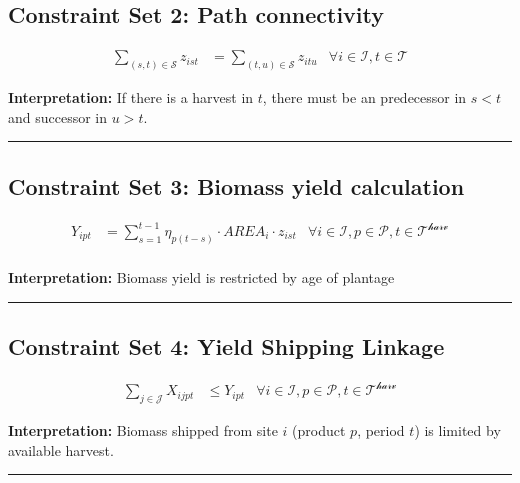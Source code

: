 \documentclass[
  11pt,
  11pt,
  a4paper]{article}
\begin{document}
\subsection{Constraint Set 2: Path
connectivity}\label{constraint-set-2-path-connectivity}

\begin{align}
\sum_{ (s,t) \in \mathcal{S}} z_{ist} &= \sum_{(t,u) \in \mathcal{S}} z_{itu} & \forall i \in \mathcal{I}, t \in \mathcal{T} \tag{C2}
\end{align}

\textbf{Interpretation:} If there is a harvest in \(t\), there must be
an predecessor in \(s<t\) and successor in \(u>t\).

\begin{center}\rule{0.5\linewidth}{0.5pt}\end{center}

\subsection{Constraint Set 3: Biomass yield
calculation}\label{constraint-set-3-biomass-yield-calculation}

\begin{align}
Y_{ipt} &= \sum_{s=1}^{t-1} \eta_{p(t-s)} \cdot AREA_i \cdot z_{ist}  & \forall i \in \mathcal{I}, p \in \mathcal{P}, t \in \mathcal{T^{harv}} \tag{C3} \\
\end{align}

\textbf{Interpretation:} Biomass yield is restricted by age of plantage

\begin{center}\rule{0.5\linewidth}{0.5pt}\end{center}

\subsection{Constraint Set 4: Yield Shipping
Linkage}\label{constraint-set-4-yield-shipping-linkage}

\begin{align}
\sum_{j \in \mathcal{J}} X_{ijpt} &\leq Y_{ipt} & \forall i \in \mathcal{I}, p \in \mathcal{P}, t \in \mathcal{T^{harv}} \tag{C4}
\end{align}

\textbf{Interpretation:} Biomass shipped from site \(i\) (product \(p\),
period \(t\)) is limited by available harvest.

\begin{center}\rule{0.5\linewidth}{0.5pt}\end{center}
\end{document}
